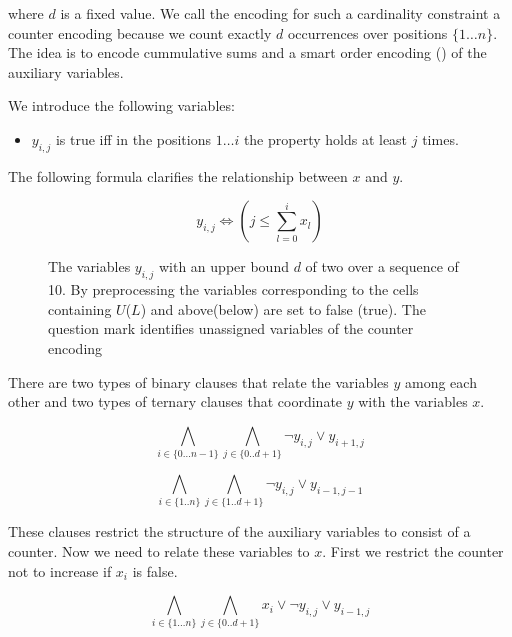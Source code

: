 \documentclass[]{llncs}
\begin{document}
where $d$ is a fixed value.  We call the encoding for such a cardinality
constraint a counter encoding because we count exactly $d$ occurrences
over positions $\{1\ldots n\}$. The idea is to encode cummulative sums
and a smart order encoding (\cite{Tamura09}) of the auxiliary variables. 

We introduce the following variables: 

\begin{itemize}
    \item $y_{i,j}$ is true iff in the positions $1 \ldots i$ the
        property holds at least $j$ times.        
\end{itemize}

The following formula clarifies the relationship between $x$ and $y$.

$$ y_{i,j} \iff (j \leq \sum_{l=0}^{i} x_{l}) $$


\begin{figure}
\centering 
\caption{The variables $y_{i,j}$ with an upper bound $d$ of two over a
    sequence of 10. By preprocessing the variables corresponding to the
    cells containing $U$($L$) and above(below) are set to false (true).
    The question mark identifies unassigned variables of the counter
    encoding}
%
\end{figure}

There are two types of binary clauses that relate the variables $y$ among
each other and two types of ternary clauses that coordinate $y$ with the
variables $x$.

\begin{equation}
    \bigwedge_{i \in \{0\ldots n-1\}} \bigwedge_{j \in\{0..d+1\}}
    \neg y_{i,j} \vee y_{i+1,j}
\end{equation}

\begin{equation}
    \bigwedge_{i \in \{1..n\}} \bigwedge_{j\in \{1..d+1\}}
    \neg y_{i,j} \vee y_{i-1,j-1}
\end{equation}

These clauses restrict the structure of the auxiliary variables to
consist of a counter. Now we need to relate these variables to $x$. 
First we restrict the counter not to increase if $x_{i}$ is
false. 


\begin{equation}
    \bigwedge_{i \in \{1\ldots n\}} \bigwedge_{j\in\{0..d+1\}}
    x_{i} \vee \neg y_{i,j} \vee y_{i-1,j}
\end{equation}
\end{document}
